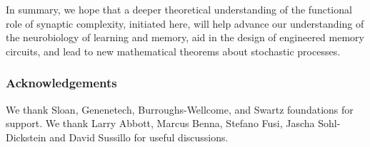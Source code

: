 \documentclass{article} %
\begin{document}
In summary, we hope that a deeper theoretical understanding of the functional role of synaptic complexity, initiated here, will help advance our understanding of the neurobiology of learning and memory, aid in the design of engineered memory circuits, and lead to new mathematical theorems about stochastic processes.



\subsubsection*{Acknowledgements}
We thank Sloan, Genenetech, Burroughs-Wellcome, and Swartz foundations for support.
We thank Larry Abbott, Marcus Benna, Stefano Fusi, Jascha Sohl-Dickstein and David Sussillo for useful discussions.





\end{document}
